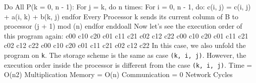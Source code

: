 \documentclass{article}%
\newenvironment{code}%
   {\snugshade\verbatim}%
   {\endverbatim\endsnugshade}
\begin{document}
\begin{Large}
\begin{code}
    Do All P(k = 0, n - 1):
        For j = k, do n times:
            For i = 0, n - 1, do:
                c(i, j) = c(i, j) + a(i, k) + b(k, j)
            endfor
        Every Processor k sends its current 
        column of B to processor (j + 1) mod (n)
        endfor
    enddoall
\end{code}
Now let's see the execution order of this program again:
\begin{code}
    c00 c10 c20 c01 c11 c21 c02 c12 c22 
    c00 c10 c20 c01 c11 c21 c02 c12 c22
    c00 c10 c20 c01 c11 c21 c02 c12 c22
\end{code}
In this case, we also unfold the program on \texttt{k}. The storage scheme is the same as case \texttt{(k, i, j)}. However, the execution order inside the processor is different from the case \texttt{(k, i, j)}.
\begin{code}
Time = O(n2) Multiplication
Memory = O(n)
Communication = 0 Network Cycles
\end{code}
\end{Large}
\end{document}
